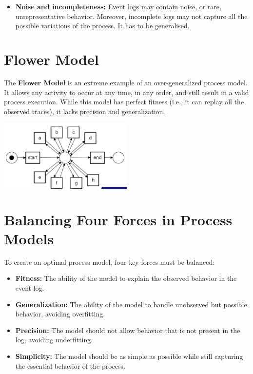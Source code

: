 \begin{itemize}
\begin{center}
        \end{center}
        \item \textbf{Noise and incompleteness:} Event logs may contain noise, or rare, unrepresentative behavior. Moreover, incomplete logs may not capture all the possible variations of the process. It has to be generalised. 
    \end{itemize}
       
    
    \section{Flower Model}
    
    The \textbf{Flower Model} is an extreme example of an over-generalized process model. It allows any activity to occur at any time, in any order, and still result in a valid process execution. While this model has perfect fitness (i.e., it can replay all the observed traces), it lacks precision and generalization.
    
    \begin{center}
        \includegraphics[width=0.5\textwidth]{capitolo 5/5 flower model.png} %
    \end{center}
    
    \section{Balancing Four Forces in Process Models}
    
    To create an optimal process model, four key forces must be balanced:
    \begin{itemize}
        \item \textbf{Fitness:} The ability of the model to explain the observed behavior in the event log.
        \item \textbf{Generalization:} The ability of the model to handle unobserved but possible behavior, avoiding overfitting.
        \item \textbf{Precision:} The model should not allow behavior that is not present in the log, avoiding underfitting.
        \item \textbf{Simplicity:} The model should be as simple as possible while still capturing the essential behavior of the process.
    \end{itemize}
    
